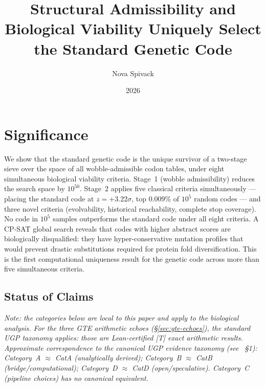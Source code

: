 \documentclass[10pt,twocolumn]{article}
\title{\vspace{-0.6em}\bf Structural Admissibility and Biological Viability Uniquely Select the Standard Genetic Code}
\author[1]{Nova Spivack}
\date{2026}
\begin{document}
\maketitle
\NovaZenodoAfterTitle

\section*{Significance}

We show that the standard genetic code is the unique survivor of a two-stage
sieve over the space of all wobble-admissible codon tables, under eight
simultaneous biological viability criteria. Stage~1 (wobble admissibility)
reduces the search space by $10^{50}$. Stage~2 applies five classical criteria
simultaneously --- placing the standard code at $z = +3.22\sigma$, top
$0.009\%$ of $10^5$ random codes --- and three novel criteria (evolvability,
historical reachability, complete stop coverage). No code in $10^5$ samples
outperforms the standard code under all eight criteria. A CP-SAT global search
reveals that codes with higher abstract scores are biologically disqualified:
they have hyper-conservative mutation profiles that would prevent drastic
substitutions required for protein fold diversification. This is the first computational uniqueness result for the genetic code
across more than five simultaneous criteria.

\subsection*{Status of Claims}

\noindent\textit{Note: the categories below are local to this paper and apply to the biological analysis. For the three GTE arithmetic echoes (\S\ref{sec:gte-echoes}), the standard UGP taxonomy applies: those are Lean-certified [T] exact arithmetic results. Approximate correspondence to the canonical UGP evidence taxonomy (see~\cite{Spivack2026_SM_UGP} \S1): Category~A $\approx$ CatA (analytically derived); Category~B $\approx$ CatB (bridge/computational); Category~D $\approx$ CatD (open/speculative). Category~C (pipeline choices) has no canonical equivalent.}
\end{document}
